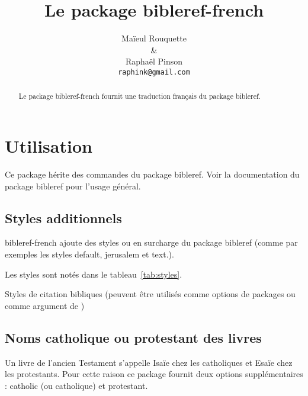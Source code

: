 \documentclass{ltxdoc}
\begin{document}
\shorthandoff{:}
\title{Le package \textsf{bibleref-french}}
\author{Ma\"ieul Rouquette \\ \& \\ Rapha\"el Pinson \\ \texttt{raphink@gmail.com}}

\maketitle
\begin{abstract}
Le  package \textsf{bibleref-french} fournit une traduction français du package \textsf{bibleref}.
\end{abstract}

\tableofcontents
\section{Utilisation}

Ce package hérite des commandes du package \textsf{bibleref}. Voir la documentation du package \textsf{bibleref} pour l'usage général.

\subsection{Styles additionnels}

\textsf{bibleref-french} ajoute des styles ou en surcharge du package \textsf{bibleref} (comme par exemples les styles \textsf{default}, \textsf{jerusalem} et \textsf{text}.).

Les styles sont notés dans le tableau~\ref{tab:styles}.

\begin{table}[tbh]
\caption{Styles de citation bibliques  (peuvent être utilisés comme options de  packages ou comme argument de  )}
\label{tab:styles}
\vspace{10pt}
\begin{center}

\end{center}
\end{table}

\subsection{Noms catholique ou protestant des livres}

Un livre de l'ancien Testament s'appelle Isaïe chez les catholiques et Esaïe chez les protestants.
Pour cette raison ce package fournit deux options supplémentaires :  \textsf{catholic} (ou \textsf{catholique}) et \textsf{protestant}. 
\end{document}

